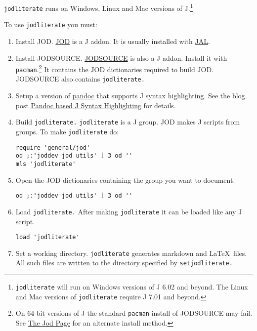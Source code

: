 \texttt{jodliterate} runs on Windows, Linux and Mac versions of
J.\footnote{\texttt{jodliterate} will run on Windows versions of J 6.02
  and beyond. The Linux and Mac versions of \texttt{jodliterate} require
  J 7.01 and beyond.}

To use \texttt{jodliterate} you must:

\begin{enumerate}[1.]
\item
  Install JOD.
  \href{http://www.jsoftware.com/jwiki/Addons/general/jod}{JOD} is a J
  addon. It is usually installed with
  \href{http://www.jsoftware.com/jwiki/JAL}{JAL}.
\item
  Install JODSOURCE.
  \href{http://www.jsoftware.com/jwiki/Addons/general/jodsource}{JODSOURCE}
  is also a J addon. Install it with \texttt{pacman}.\footnote{On 64 bit versions of
    J the standard \texttt{pacman} install of JODSOURCE may fail. See
    \href{http://bakerjd99.wordpress.com/the-jod-page/\#comment-210}{The
    Jod Page} for an alternate install method.} It contains the JOD
  dictionaries required to build JOD. JODSOURCE also contains
  \texttt{jodliterate.}
\item
  Setup a version of \href{http://johnmacfarlane.net/pandoc/}{pandoc}
  that supports J syntax highlighting. See the blog post
  \href{http://bakerjd99.wordpress.com/2012/09/20/pandoc-based-j-syntax-highlighting/}{Pandoc
  based J Syntax Highlighting} for details.
\item
  Build \texttt{jodliterate.} \texttt{jodliterate} is a J group. JOD
  makes J scripts from groups. To make \texttt{jodliterate} do:

\begin{verbatim}
require 'general/jod'
od ;:'joddev jod utils' [ 3 od ''
mls 'jodliterate'
\end{verbatim}
\item
  Open the JOD dictionaries containing the group you want to document.

\begin{verbatim}
od ;:'joddev jod utils' [ 3 od ''
\end{verbatim}
\item
  Load \texttt{jodliterate.} After making \texttt{jodliterate} it can be
  loaded like any J script.

\begin{verbatim}
load 'jodliterate'
\end{verbatim}
\item
  Set a working directory. \texttt{jodliterate} generates markdown and
  \LaTeX~files. All such files are written to the directory specified by
  \texttt{setjodliterate.}


\end{enumerate}
